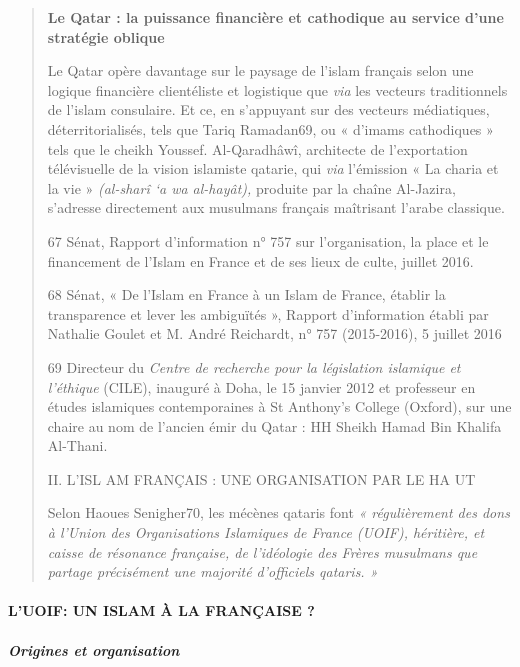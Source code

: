 \begin{quote}
\textbf{Le Qatar : la puissance financière et cathodique au service
d'une stratégie oblique}

Le Qatar opère davantage sur le paysage de l'islam français selon une
logique financière clientéliste et logistique que \emph{via} les
vecteurs traditionnels de l'islam consulaire. Et ce, en s'appuyant sur
des vecteurs médiatiques, déterritorialisés, tels que Tariq Ramadan69,
ou « d'imams cathodiques » tels que le cheikh Youssef. Al-Qaradhâwî,
architecte de l'exportation télévisuelle de la vision islamiste qatarie,
qui \emph{via} l'émission « La charia et la vie » \emph{(al-sharî `a wa
al-hayât),} produite par la chaîne Al-Jazira, s'adresse directement aux
musulmans français maîtrisant l'arabe classique.

67 Sénat, Rapport d'information n° 757 sur l'organisation, la place et
le financement de l'Islam en France et de ses lieux de culte, juillet
2016.

68 Sénat, « De l'Islam en France à un Islam de France, établir la
transparence et lever les ambiguïtés », Rapport d'information établi par
Nathalie Goulet et M. André Reichardt, n° 757 (2015-2016), 5 juillet
2016

69 Directeur du \emph{Centre de recherche pour la législation islamique
et l'éthique} (CILE), inauguré à Doha, le 15 janvier 2012 et professeur
en études islamiques contemporaines à St Anthony's College (Oxford), sur
une chaire au nom de l'ancien émir du Qatar : HH Sheikh Hamad Bin
Khalifa Al-Thani.

II. L'ISL AM FRANÇAIS : UNE ORGANISATION PAR LE HA UT

Selon Haoues Senigher70, les mécènes qataris font \emph{« régulièrement
des dons à l'Union des Organisations Islamiques de France (UOIF),
héritière, et caisse de résonance française, de l'idéologie des Frères
musulmans que partage précisément une majorité d'officiels qataris. »}
\end{quote}

\hypertarget{luoif-un-islam-uxe0-la-franuxe7aise}{%
\paragraph{L'UOIF: UN ISLAM À LA FRANÇAISE
?}\label{luoif-un-islam-uxe0-la-franuxe7aise}}

\hypertarget{origines-et-organisation}{%
\subparagraph{Origines et organisation}\label{origines-et-organisation}}

